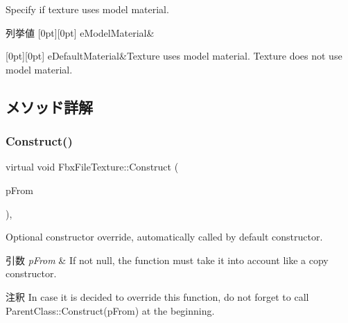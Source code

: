 Specify if texture uses model material. \begin{DoxyEnumFields}{列挙値}
[0pt][0pt]{}\mbox{\label{class_fbx_file_texture_ae85eb429015d450d8cb8a753634c0d1ea0819de314e6f6458e1bc017c536e0821}} 
e\+Model\+Material&\\
\hline

[0pt][0pt]{}\mbox{\label{class_fbx_file_texture_ae85eb429015d450d8cb8a753634c0d1ea494e44ff611551c1172d7c9783690caa}} 
e\+Default\+Material&Texture uses model material. Texture does not use model material. \\
\hline

\end{DoxyEnumFields}


\subsection{メソッド詳解}
\mbox{\label{class_fbx_file_texture_a107d1612fc50f17722c77ee8df236eeb}} 
\subsubsection{\texorpdfstring{Construct()}{Construct()}}
{\footnotesize\ttfamily virtual void Fbx\+File\+Texture\+::\+Construct (\begin{DoxyParamCaption}\item[{const \hyperlink{class_fbx_object}{Fbx\+Object} $\ast$}]{p\+From }\end{DoxyParamCaption})\hspace{0.3cm}{\ttfamily [protected]}, {\ttfamily [virtual]}}

Optional constructor override, automatically called by default constructor. 
\begin{DoxyParams}{引数}
{\em p\+From} & If not null, the function must take it into account like a copy constructor. \\
\hline
\end{DoxyParams}
\begin{DoxyRemark}{注釈}
In case it is decided to override this function, do not forget to call Parent\+Class\+::\+Construct(p\+From) at the beginning. 
\end{DoxyRemark}


